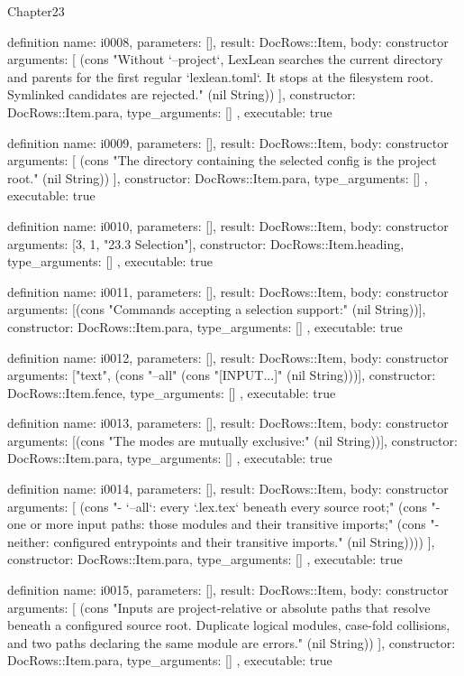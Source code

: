 \begin{lexlean}{Chapter23}
\begin{semanticmodule}
definition{
  name: i0008,
  parameters: [],
  result: DocRows::Item,
  body: constructor{
    arguments: [
      (cons "Without `--project`, LexLean searches the current directory and parents for the first regular `lexlean.toml`. It stops at the filesystem root. Symlinked candidates are rejected." (nil String))
    ],
    constructor: DocRows::Item.para,
    type_arguments: []
  },
  executable: true
}

definition{
  name: i0009,
  parameters: [],
  result: DocRows::Item,
  body: constructor{
    arguments: [
      (cons "The directory containing the selected config is the project root." (nil String))
    ],
    constructor: DocRows::Item.para,
    type_arguments: []
  },
  executable: true
}

definition{
  name: i0010,
  parameters: [],
  result: DocRows::Item,
  body: constructor{
    arguments: [3, 1, "23.3 Selection"],
    constructor: DocRows::Item.heading,
    type_arguments: []
  },
  executable: true
}

definition{
  name: i0011,
  parameters: [],
  result: DocRows::Item,
  body: constructor{
    arguments: [(cons "Commands accepting a selection support:" (nil String))],
    constructor: DocRows::Item.para,
    type_arguments: []
  },
  executable: true
}

definition{
  name: i0012,
  parameters: [],
  result: DocRows::Item,
  body: constructor{
    arguments: ["text", (cons "--all" (cons "[INPUT...]" (nil String)))],
    constructor: DocRows::Item.fence,
    type_arguments: []
  },
  executable: true
}

definition{
  name: i0013,
  parameters: [],
  result: DocRows::Item,
  body: constructor{
    arguments: [(cons "The modes are mutually exclusive:" (nil String))],
    constructor: DocRows::Item.para,
    type_arguments: []
  },
  executable: true
}

definition{
  name: i0014,
  parameters: [],
  result: DocRows::Item,
  body: constructor{
    arguments: [
      (cons "- `--all`: every `.lex.tex` beneath every source root;" (cons "- one or more input paths: those modules and their transitive imports;" (cons "- neither: configured entrypoints and their transitive imports." (nil String))))
    ],
    constructor: DocRows::Item.para,
    type_arguments: []
  },
  executable: true
}

definition{
  name: i0015,
  parameters: [],
  result: DocRows::Item,
  body: constructor{
    arguments: [
      (cons "Inputs are project-relative or absolute paths that resolve beneath a configured source root. Duplicate logical modules, case-fold collisions, and two paths declaring the same module are errors." (nil String))
    ],
    constructor: DocRows::Item.para,
    type_arguments: []
  },
  executable: true
}


\end{semanticmodule}
\end{lexlean}

